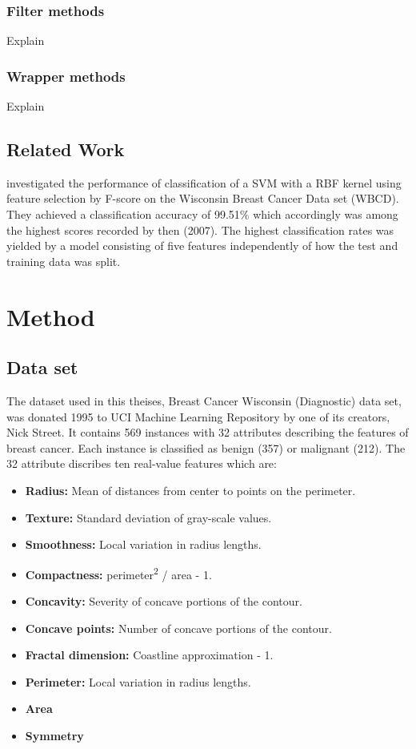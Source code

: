 \documentclass{kththesis}
\begin{document}
\subsection{Filter methods}

Explain

\subsection{Wrapper methods}

Explain

\section{Related Work}

\textcite{akay2009} investigated the performance of classification of a SVM with a RBF kernel using feature selection by F-score on the Wisconsin Breast Cancer Data set (WBCD). They achieved a classification accuracy of 99.51\% which accordingly was among the highest scores recorded by then (2007). The highest classification rates was yielded by a model consisting of five features independently of how the test and training data was split.

\chapter{Method}

\section{Data set}

The dataset used in this theises, Breast Cancer Wisconsin (Diagnostic) data set, was donated 1995 to UCI  Machine Learning Repository \parencite{Dua:2017} by one of its creators, Nick Street. It contains 569 instances with 32 attributes describing the features of breast cancer. Each instance is classified as benign (357) or malignant (212). The 32 attribute discribes ten real-value features which are:

\begin{itemize} \itemsep0pt \parskip0pt 
	\item \textbf{Radius:} Mean of distances from center to points on the perimeter.
	\item \textbf{Texture:} Standard deviation of gray-scale values.
	\item \textbf{Smoothness:} Local variation in radius lengths.
  \item \textbf{Compactness:} perimeter\textsuperscript{2} / area - 1.
  \item \textbf{Concavity:} Severity of concave portions of the contour.
  \item \textbf{Concave points:} Number of concave portions of the contour.
  \item \textbf{Fractal dimension:} Coastline approximation - 1.
  \item \textbf{Perimeter:} Local variation in radius lengths.
  \item \textbf{Area}
  \item \textbf{Symmetry}
\end{itemize}
\end{document}
